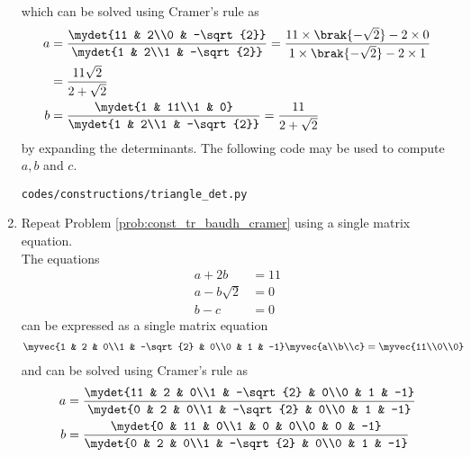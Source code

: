 \begin{enumerate}[label=\arabic*.,ref=\thesubsection.\theenumi]
\begin{align}
\end{align}
%
which can be solved using Cramer's rule as
\begin{align}
\label{eq:tr_const_ex_sum_ab_mat_sol}
a &= \frac{\mydet{11 & 2\\0 & -\sqrt{2}}}{\mydet{1 & 2\\1 & -\sqrt{2}}} = \frac{11 \times \brak{-\sqrt{2}}-2\times 0}{1\times \brak{-\sqrt{2}} - 2 \times 1} 
\\
&= \frac{11\sqrt{2}}{2+\sqrt{2}}
\\
b &= \frac{\mydet{1 & 11\\1 & 0}}{\mydet{1 & 2\\1 & -\sqrt{2}}} = \frac{11}{2+\sqrt{2}}
\end{align}
%
by expanding the determinants.  The following code may be used to compute $a, b$ and $c$.
\begin{lstlisting}
codes/constructions/triangle_det.py
\end{lstlisting}
\item Repeat Problem \ref{prob:const_tr_baudh_cramer} using a single matrix equation.
\\
\solution The equations 
\begin{align}
\label{eq:tr_const_ex_sum_abc}
a + 2b &= 11
\\
a - b\sqrt{2} &=0
\\
b-c &=0
\end{align}
can be expressed as a single matrix equation
\begin{align}
\label{eq:tr_const_ex_sum_abc_mat}
\myvec{1 & 2 & 0\\1 & -\sqrt{2} & 0\\0 & 1 & -1} \myvec{a\\b\\c} &= \myvec{11\\0\\0}
\end{align}
%
and can be solved using Cramer's rule as
\begin{align}
\label{eq:tr_const_ex_sum_abc_mat_sol}
a &= \frac{\mydet{11 & 2 & 0\\1 & -\sqrt{2} & 0\\0 & 1 & -1}}{\mydet{0 & 2 & 0\\1 & -\sqrt{2} & 0\\0 & 1 & -1}} 
\\
b &= \frac{\mydet{0 & 11 & 0\\1 & 0 & 0\\0 & 0 & -1}}{\mydet{0 & 2 & 0\\1 & -\sqrt{2} & 0\\0 & 1 & -1}} 

\end{align}
\end{enumerate}
